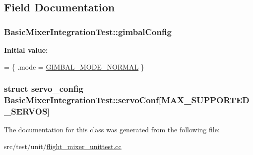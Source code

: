 \subsection{Field Documentation}
\hypertarget{classBasicMixerIntegrationTest_ae7a4a47c5446b70da61616045ef4d6d5}{
\subsubsection[{gimbal\+Config}]{ Basic\+Mixer\+Integration\+Test\+::gimbal\+Config\hspace{0.3cm}{\ttfamily [protected]}}}\label{classBasicMixerIntegrationTest_ae7a4a47c5446b70da61616045ef4d6d5}
{\bfseries Initial value\+:}
\begin{DoxyCode}
= \{
        .mode = \hyperlink{gimbal_8h_a476e1e393c4cbd70456ab49762dc4c07a4386c90f607f136f8eff35f485b23127}{GIMBAL\_MODE\_NORMAL}
    \}
\end{DoxyCode}
\hypertarget{classBasicMixerIntegrationTest_a69cedae3d3b6dabc8edb8da44c5e3317}{
\subsubsection[{servo\+Conf}]{\setlength{\rightskip}{0pt plus 5cm}struct {\bf servo\+\_\+config} Basic\+Mixer\+Integration\+Test\+::servo\+Conf\mbox{[}{\bf M\+A\+X\+\_\+\+S\+U\+P\+P\+O\+R\+T\+E\+D\+\_\+\+S\+E\+R\+V\+O\+S}\mbox{]}\hspace{0.3cm}{\ttfamily [protected]}}}\label{classBasicMixerIntegrationTest_a69cedae3d3b6dabc8edb8da44c5e3317}


The documentation for this class was generated from the following file\+:\begin{DoxyCompactItemize}
\item 
src/test/unit/\hyperlink{flight__mixer__unittest_8cc}{flight\+\_\+mixer\+\_\+unittest.\+cc}\end{DoxyCompactItemize}

